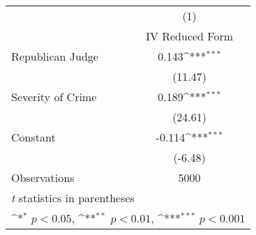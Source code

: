 {
\def\sym#1{\ifmmode^{#1}\else\(^{#1}\)\fi}
\begin{tabular}{l*{1}{c}}
\hline\hline
                    &\multicolumn{1}{c}{(1)}\\
                    &\multicolumn{1}{c}{IV Reduced Form}\\
\hline
Republican Judge    &       0.143\sym{***}\\
                    &     (11.47)         \\
[1em]
Severity of Crime   &       0.189\sym{***}\\
                    &     (24.61)         \\
[1em]
Constant            &      -0.114\sym{***}\\
                    &     (-6.48)         \\
\hline
Observations        &        5000         \\
\hline\hline
\multicolumn{2}{l}{\footnotesize \textit{t} statistics in parentheses}\\
\multicolumn{2}{l}{\footnotesize \sym{*} \(p<0.05\), \sym{**} \(p<0.01\), \sym{***} \(p<0.001\)}\\
\end{tabular}
}
